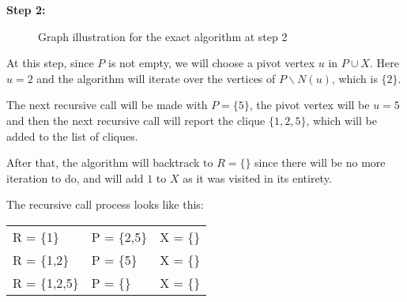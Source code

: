 \begin{minipage}{\linewidth}
    \textbf{Step 2:} \newline
    \begin{minipage}{0.4\textwidth}
        \begin{figure}[H]
            \centering
            \caption{Graph illustration for the exact algorithm at step 2}
            \label{fig:exact-mewc-step2}
        \end{figure}
    \end{minipage}
    \begin{minipage}{0.6\textwidth}
        At this step, since $P$ is not empty, we will choose a pivot vertex $u$
        in $P\cup X$. Here $u = 2$ and the algorithm will iterate over the
        vertices of $P\backslash N(u)$, which is $\{2\}$. \newline

        The next recursive call will be made with $P = \{5\}$, the pivot vertex
        will be $u = 5$ and then the next recursive call will report the clique
        $\{1,2,5\}$, which will be added to the list of cliques. \newline

        After that, the algorithm will backtrack to $R=\{\}$ since there will be
        no more iteration to do, and will add $1$ to $X$ as it was visited in
        its entirety. \newline

        The recursive call process looks like this:
        \begin{center}
            \begin{tabular}{|lll|}
                \hline
                R = \{1\}     & P = \{2,5\} & X = \{\} \\
                R = \{1,2\}   & P = \{5\}   & X = \{\} \\
                R = \{1,2,5\} & P = \{\}    & X = \{\} \\
                \hline
            \end{tabular}
        \end{center}
    \end{minipage}
\end{minipage} \newline

